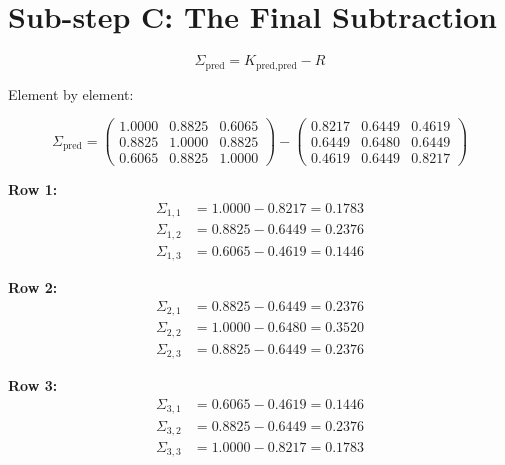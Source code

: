 \documentclass[11pt, a4paper]{article}
\begin{document}
\section*{\color{secblue}Sub-step C: The Final Subtraction}

\begin{equation}
\Sigma_{\text{pred}} = K_{\text{pred,pred}} - R
\tag{S6-20}
\end{equation}

Element by element:

\begin{equation}
\Sigma_{\text{pred}} =
\begin{pmatrix}
1.0000 & 0.8825 & 0.6065 \\
0.8825 & 1.0000 & 0.8825 \\
0.6065 & 0.8825 & 1.0000
\end{pmatrix}
-
\begin{pmatrix}
0.8217 & 0.6449 & 0.4619 \\
0.6449 & 0.6480 & 0.6449 \\
0.4619 & 0.6449 & 0.8217
\end{pmatrix}
\tag{S6-21}
\end{equation}

\bigskip
\textbf{Row 1:}
\begin{align}
\Sigma_{1,1} &= 1.0000 - 0.8217 = \mathbf{0.1783} \tag{S6-22a} \\
\Sigma_{1,2} &= 0.8825 - 0.6449 = \mathbf{0.2376} \tag{S6-22b} \\
\Sigma_{1,3} &= 0.6065 - 0.4619 = \mathbf{0.1446} \tag{S6-22c}
\end{align}

\textbf{Row 2:}
\begin{align}
\Sigma_{2,1} &= 0.8825 - 0.6449 = \mathbf{0.2376} \tag{S6-23a} \\
\Sigma_{2,2} &= 1.0000 - 0.6480 = \mathbf{0.3520} \tag{S6-23b} \\
\Sigma_{2,3} &= 0.8825 - 0.6449 = \mathbf{0.2376} \tag{S6-23c}
\end{align}

\textbf{Row 3:}
\begin{align}
\Sigma_{3,1} &= 0.6065 - 0.4619 = \mathbf{0.1446} \tag{S6-24a} \\
\Sigma_{3,2} &= 0.8825 - 0.6449 = \mathbf{0.2376} \tag{S6-24b} \\
\Sigma_{3,3} &= 1.0000 - 0.8217 = \mathbf{0.1783} \tag{S6-24c}
\end{align}
\end{document}
